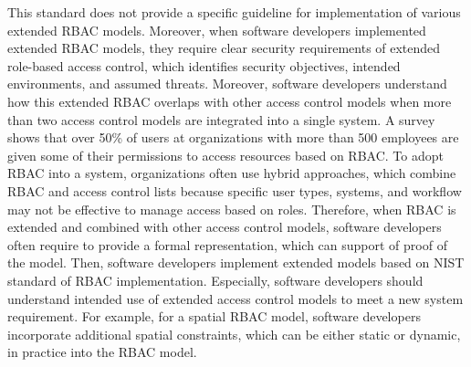 This standard does not provide a specific guideline for implementation of various extended RBAC models.
Moreover, when software developers implemented extended RBAC models, they require clear security requirements of extended role-based access control, which identifies security objectives, intended environments, and assumed threats. Moreover, software developers understand how this extended RBAC overlaps with other access control models when more than two access control models are integrated into a single system. A survey~\cite{o20102010} shows that over 50\% of users at organizations with more than 500 employees are given some of their permissions to access resources based on RBAC. To adopt RBAC into a system, organizations often use hybrid approaches, which combine RBAC and access control lists because specific user types, systems, and workflow may not be effective to manage access based on roles. Therefore, when RBAC is extended and combined with other access control models, software developers often require to provide a formal representation, which can support of proof of the model. Then, software developers implement extended models based on NIST standard of RBAC implementation. Especially, software developers should understand intended use of extended access control models to meet a new system requirement. For example, for a spatial RBAC model, software developers incorporate additional spatial constraints, which can be either static or dynamic, in practice into the RBAC model.


